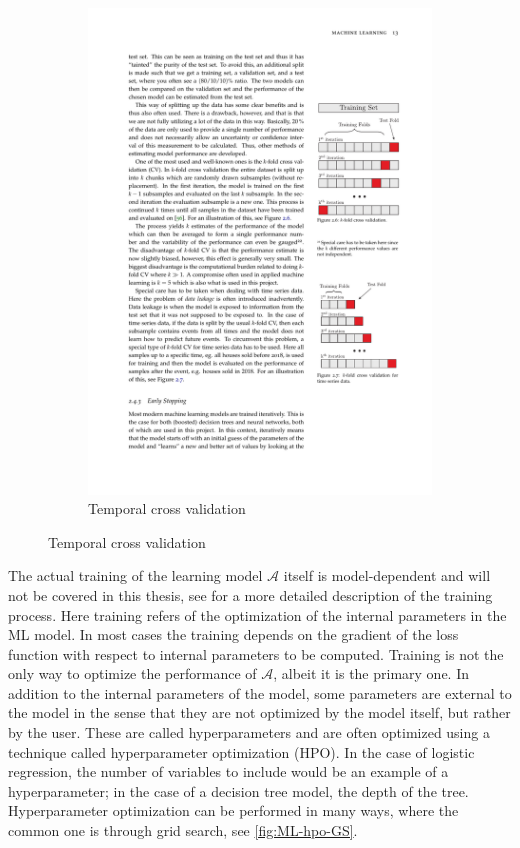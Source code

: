 \begin{figure}[htbp]
\begin{subfigure}{.5\textwidth}
        \includegraphics[trim={14.14cm 7.67cm 2.1cm 16.5cm}, clip, width=.8\linewidth]{figures/MasterThesis-cross-validation}
        \caption{Temporal cross validation}
        \label{fig:ML-crossval-temporal}
    \end{subfigure}
\end{figure}

The actual training of the learning model $\mathcal{A}$ itself is model-dependent and will not be covered in this thesis, see \cite{michelsenPhysicistApproachMachine2020} for a more detailed description of the training process. Here training refers of the optimization of the internal parameters in the ML model. In most cases the training depends on the gradient of the loss function with respect to internal parameters to be computed. Training is not the only way to optimize the performance of  $\mathcal{A}$, albeit it is the primary one. In addition to the internal parameters of the model, some parameters are external to the model in the sense that they are not optimized by the model itself, but rather by the user. These are called hyperparameters and are often optimized using a technique called hyperparameter optimization (HPO). In the case of logistic regression, the number of variables to include would be an example of a hyperparameter; in the case of a decision tree model, the depth of the tree. Hyperparameter optimization can be performed in many ways, where the common one is through grid search, see \autoref{fig:ML-hpo-GS}.

